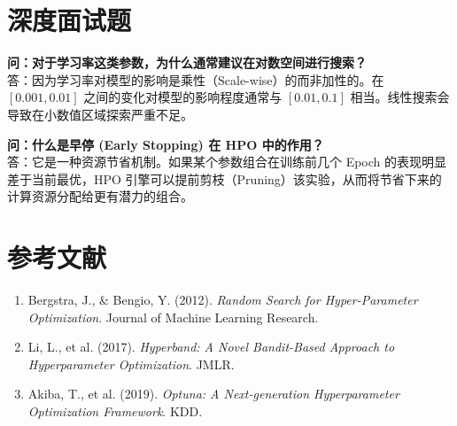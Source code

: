 \documentclass[12pt, a4paper]{article}
\begin{document}
\section{深度面试题}

\textbf{问：对于学习率这类参数，为什么通常建议在对数空间进行搜索？}\\
答：因为学习率对模型的影响是乘性（Scale-wise）的而非加性的。在 $[0.001, 0.01]$ 之间的变化对模型的影响程度通常与 $[0.01, 0.1]$ 相当。线性搜索会导致在小数值区域探索严重不足。

\textbf{问：什么是早停 (Early Stopping) 在 HPO 中的作用？}\\
答：它是一种资源节省机制。如果某个参数组合在训练前几个 Epoch 的表现明显差于当前最优，HPO 引擎可以提前剪枝（Pruning）该实验，从而将节省下来的计算资源分配给更有潜力的组合。

\section{参考文献}
\begin{enumerate}
    \item Bergstra, J., \& Bengio, Y. (2012). \textit{Random Search for Hyper-Parameter Optimization}. Journal of Machine Learning Research.
    \item Li, L., et al. (2017). \textit{Hyperband: A Novel Bandit-Based Approach to Hyperparameter Optimization}. JMLR.
    \item Akiba, T., et al. (2019). \textit{Optuna: A Next-generation Hyperparameter Optimization Framework}. KDD.
\end{enumerate}
\end{document}
